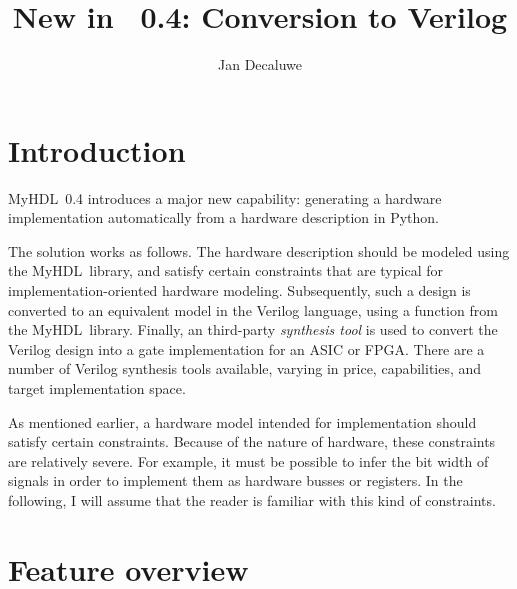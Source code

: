 \documentclass{howto}
\title{New in \myhdl\ 0.4: Conversion to Verilog}
\author{Jan Decaluwe}
\newcommand{\myhdl}{\protect \mbox{MyHDL}}
\begin{document}
\maketitle
\tableofcontents


\section{Introduction}

\myhdl\ 0.4 introduces a major new capability: 
generating a hardware implementation automatically
from a hardware description in Python. 

The solution works as follows. The hardware description should be
modeled using the \myhdl\ library, and satisfy certain constraints
that are typical for implementation-oriented hardware modeling.
Subsequently, such a design is converted to an equivalent model in the
Verilog language, using a function from the \myhdl\ library. Finally,
an third-party \emph{synthesis tool} is used to convert the Verilog
design into a gate implementation for an ASIC or FPGA. There are a
number of Verilog synthesis tools available, varying in price,
capabilities, and target implementation space.

As mentioned earlier, a hardware model intended for implementation
should satisfy certain constraints. Because of the nature of hardware,
these constraints are relatively severe.  For example,
it must be possible to infer the bit width of signals in order to
implement them as hardware busses or registers.  In the following, I
will assume that the reader is familiar with this kind of constraints.


\section{Feature overview\label{section-feature}}
\end{document}
